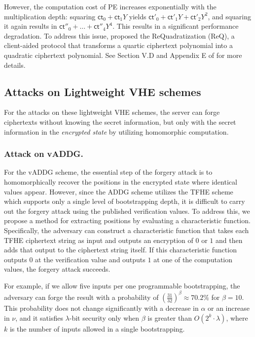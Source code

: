 \documentclass[runningheads]{llncs}
\newcommand{\ct}{\textsf{ct}{}}
\newcommand{\PE}{\textsf{PE}{}}
\newcommand{\REQ}{\textsf{ReQ}}
\begin{document}
        However, the computation cost of \PE{} increases exponentially with the multiplication depth: squaring \(\ct_0 + \ct_1Y\) yields \(\ct'_0 + \ct'_1Y + \ct'_2Y^2\), and squaring it again results in \(\ct''_0 + \dots + \ct''_4Y^4\). This results in a significant performance degradation. To address this issue, \cite{VE} proposed the ReQuadratization (\REQ{}), a client-aided protocol that transforms a quartic ciphertext polynomial into a quadratic ciphertext polynomial. See Section V.D and Appendix E of \cite{VE} for more details.

    \subsection{Attacks on Lightweight VHE schemes}
    For the attacks on these lightweight VHE schemes, the server can forge ciphertexts without knowing the secret information, but only with the secret information in the \emph{encrypted state} by utilizing homomorphic computation. 
    
        \subsubsection{Attack on vADDG.}
        For the vADDG scheme, the essential step of the forgery attack is to homomorphically recover the positions in the encrypted state where identical values appear.
        However, since the ADDG scheme utilizes the TFHE scheme which supports only a single level of bootstrapping depth, it is difficult to carry out the forgery attack using the published verification values. To address this, we propose a method for extracting positions by evaluating a characteristic function. Specifically, the adversary can construct a characteristic function that takes each TFHE ciphertext string as input and outputs an encryption of \(0\) or \(1\) and then adds that output to the ciphertext string itself. If this characteristic function outputs \(0\) at the verification value and outputs \(1\) at one of the computation values, the forgery attack succeeds.
    
        For example, if we allow five inputs per one programmable bootstrapping, the adversary can forge the result with a probability of 
        \(
        \left(\frac{31}{32}\right)^{\beta} \approx 70.2\%
        \)
        for \(\beta = 10\). This probability does not change significantly with a decrease in \(\alpha\) or an increase in \(\nu\), and it satisfies \(\lambda\)-bit security only when \(\beta\) is greater than \(O(2^k \cdot \lambda)\), where \(k\) is the number of inputs allowed in a single bootstrapping.
\end{document}
